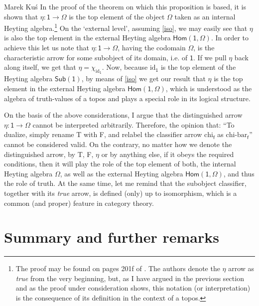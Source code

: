 \begin{artengenv}{Marek Ku\'s}
In the proof of the theorem on which this proposition is based, it is shown that $ \eta:\textsf{1}\to\Omega $ is the top element of the object $ \Omega $ taken as an internal Heyting algebra.\footnote{The proof may be found on pages 201f of \parencite{maclane-moerdijk-1994}. The authors denote the $ \eta $ arrow as \textit{true} from the very beginning, but, as I have argued in the previous section and as the proof under consideration shows, this notation (or interpretation) is the consequence of its definition in the context of a topos.} On the `external level', assuming \eqref{iso}, we may easily see that $ \eta $ is also the top element in the external Heyting algebra $ \textsf{Hom}(\textsf{1},\Omega) $. In order to achieve this let us note that $ \eta:\textsf{1}\to\Omega $, having the codomain $ \Omega $, is the characteristic arrow for some subobject of its domain, i.e. of $ \textsf{1} $. If we pull $ \eta $ back along itself, we get that $ \eta=\chi_{\text{id}_\textsf{1}} $. Now, because $ \text{id}_\textsf{1} $ is the top element of the Heyting algebra $ \textsf{Sub}(\textsf{1}) $, by means of \eqref{iso} we get our result that $ \eta $ is the top element in the external Heyting algebra $ \textsf{Hom}(\textsf{1},\Omega) $, which is understood as the algebra of truth-values of a topos and plays a special role in its logical structure.

On the basis of the above considerations, I argue that the distinguished arrow $ \eta: \textsf{1} \to \Omega $ cannot be interpreted arbitrarily. Therefore, the opinion that: ``To dualize, simply rename \textsf{T} with \textsf{F}, and relabel the classifier arrow $\text{chi}_\textsf{f}$ as $\text{chi-bar}_\textsf{f}$''  \parencite[see][p.259]{mortensen-2003} cannot be considered valid. On the contrary, no matter how we denote the distinguished arrow, by \textsf{T}, \textsf{F}, $ \eta $ or by anything else, if it obeys the required conditions, then it will play the role of the top element of both, the internal Heyting algebra $ \Omega $, as well as the external Heyting algebra $ \textsf{Hom}(\textsf{1},\Omega) $, and thus the role of truth. At the same time, let me remind that the subobject classifier, together with its \textit{true} arrow, is defined (only) up to isomorphism, which is a common (and proper) feature in category theory.



\section{Summary and further remarks}
\label{summary}


\end{artengenv}
